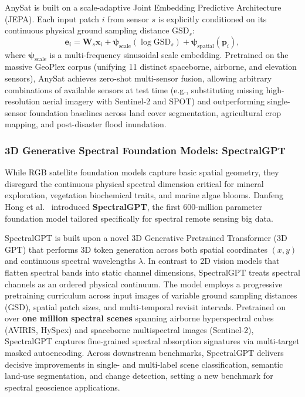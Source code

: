 AnySat is built on a scale-adaptive Joint Embedding Predictive Architecture (JEPA). Each input patch $i$ from sensor $s$ is explicitly conditioned on its continuous physical ground sampling distance $\text{GSD}_s$:
\begin{equation}
    \mathbf{e}_i = \mathbf{W}_s \mathbf{x}_i + \boldsymbol{\psi}_{\text{scale}}(\log \text{GSD}_s) + \boldsymbol{\psi}_{\text{spatial}}(\mathbf{p}_i),
\end{equation}
where $\boldsymbol{\psi}_{\text{scale}}$ is a multi-frequency sinusoidal scale embedding. Pretrained on the massive GeoPlex corpus (unifying 11 distinct spaceborne, airborne, and elevation sensors), AnySat achieves zero-shot multi-sensor fusion, allowing arbitrary combinations of available sensors at test time (e.g., substituting missing high-resolution aerial imagery with Sentinel-2 and SPOT) and outperforming single-sensor foundation baselines across land cover segmentation, agricultural crop mapping, and post-disaster flood inundation.

\subsubsection{3D Generative Spectral Foundation Models: SpectralGPT}
While RGB satellite foundation models capture basic spatial geometry, they disregard the continuous physical spectral dimension critical for mineral exploration, vegetation biochemical traits, and marine algae blooms. Danfeng Hong et al.~\cite{hong2024spectralgpt} introduced \textbf{SpectralGPT}, the first 600-million parameter foundation model tailored specifically for spectral remote sensing big data.

SpectralGPT is built upon a novel 3D Generative Pretrained Transformer (3D GPT) that performs 3D token generation across both spatial coordinates $(x, y)$ and continuous spectral wavelengths $\lambda$. In contrast to 2D vision models that flatten spectral bands into static channel dimensions, SpectralGPT treats spectral channels as an ordered physical continuum. The model employs a progressive pretraining curriculum across input images of variable ground sampling distances (GSD), spatial patch sizes, and multi-temporal revisit intervals. Pretrained on over \textbf{one million spectral scenes} spanning airborne hyperspectral cubes (AVIRIS, HySpex) and spaceborne multispectral images (Sentinel-2), SpectralGPT captures fine-grained spectral absorption signatures via multi-target masked autoencoding. Across downstream benchmarks, SpectralGPT delivers decisive improvements in single- and multi-label scene classification, semantic land-use segmentation, and change detection, setting a new benchmark for spectral geoscience applications.

